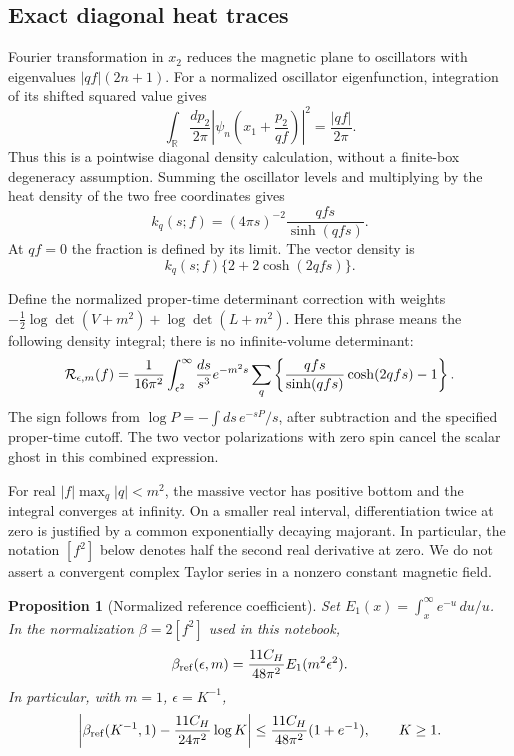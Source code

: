 \documentclass[11pt]{article}
\newtheorem{proposition}[theorem]{Proposition}
\theoremstyle{remark}
\begin{document}
\subsection{Exact diagonal heat traces}
\label{mcr-heat-section}

Fourier transformation in \(x_2\) reduces the magnetic
plane to oscillators with eigenvalues \(|qf|(2n+1)\).
For a normalized oscillator eigenfunction, integration
of its shifted squared value gives
\[
 \int_{\mathbb R}\frac{dp_2}{2\pi}
  \left|\psi_n\!\left(x_1+\frac{p_2}{qf}\right)\right|^2
       =\frac{|qf|}{2\pi}.
\]
Thus this is a pointwise diagonal density calculation,
without a finite-box degeneracy assumption. Summing the
oscillator levels and multiplying by the heat density
of the two free coordinates gives
\begin{equation}
 k_q(s;f)=(4\pi s)^{-2}\frac{qfs}{\sinh(qfs)}.
 \label{mcr-scalar-heat}
\end{equation}
At \(qf=0\) the fraction is defined by its limit.
The vector density is
\[
 k_q(s;f)\{2+2\cosh(2qfs)\}.
\]

Define the normalized proper-time determinant correction
with weights \(-\tfrac12\log\det(V+m^2)+\log\det(L+m^2)\).
Here this phrase means the following density integral;
there is no infinite-volume determinant:
\begin{equation}
 {\cal R}_{\epsilon,m}(f)
 =\frac1{16\pi^2}\int_{\epsilon^2}^{\infty}
       \frac{ds}{s^3}e^{-m^2s}
       \sum_q\left\{\frac{qfs}{\sinh(qfs)}
                          \cosh(2qfs)-1\right\}.
 \label{mcr-reference}
\end{equation}
The sign follows from
\(\log P=-\int ds\,e^{-sP}/s\), after subtraction and
the specified proper-time cutoff. The two vector
polarizations with zero spin cancel the scalar ghost
in this combined expression.

For real \(|f|\max_q|q|<m^2\), the massive vector has
positive bottom and the integral converges at infinity.
On a smaller real interval, differentiation twice at
zero is justified by a common exponentially decaying
majorant. In particular, the notation \([f^2]\) below
denotes half the second real derivative at zero.
We do not assert a convergent complex Taylor series
in a nonzero constant magnetic field.

\begin{proposition}[Normalized reference coefficient]
\label{mcr-coefficient}
Set \(E_1(x)=\int_x^\infty e^{-u}\,du/u\). In the
normalization \(\beta=2[f^2]\) used in this notebook,
\begin{equation}
 \beta_{\rm ref}(\epsilon,m)
       =\frac{11C_H}{48\pi^2}E_1(m^2\epsilon^2).
 \label{mcr-beta}
\end{equation}
In particular, with \(m=1\), \(\epsilon=K^{-1}\),
\begin{equation}
 \left|\beta_{\rm ref}(K^{-1},1)
           -\frac{11C_H}{24\pi^2}\log K\right|
 \le \frac{11C_H}{48\pi^2}(1+e^{-1}),\qquad K\ge1.
 \label{mcr-finite-part}
\end{equation}
\end{proposition}
\end{document}

